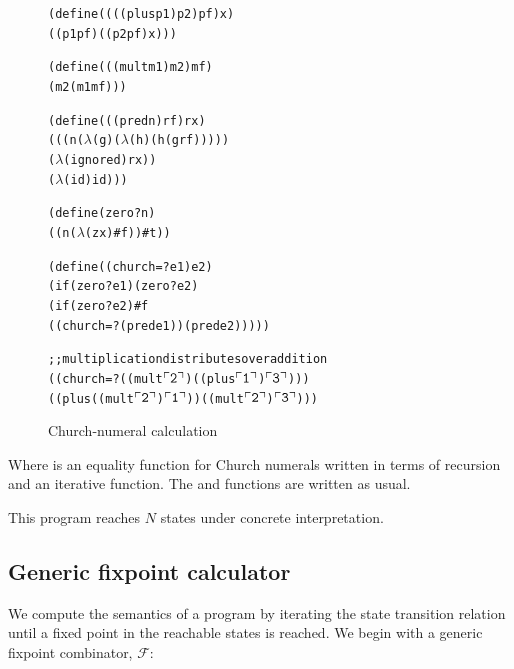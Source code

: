 \documentclass[preprint,onecolumn,9pt]{sigplanconf} %
\begin{document}
\newcommand{\church}[1]{\(\ulcorner{\tt #1}\urcorner\)}





\begin{figure}
\begin{alltt}
(define ((((plus p1) p2) pf) x)
  ((p1 pf) ((p2 pf) x)))

(define (((mult m1) m2) mf)
  (m2 (m1 mf)))

(define (((pred n) rf) rx)
  (((n (\(\lambda\) (g) (\(\lambda\) (h) (h (g rf)))))
    (\(\lambda\) (ignored) rx))
   (\(\lambda\) (id) id)))

(define (zero? n)
  ((n (\(\lambda\) (zx) #f)) #t))

(define ((church=? e1) e2)
  (if (zero? e1) (zero? e2)
      (if (zero? e2) #f
          ((church=? (pred e1)) (pred e2)))))

;; multiplication distributes over addition
((church=? ((mult \church2) ((plus \church1) \church3)))
 ((plus ((mult \church2) \church1)) ((mult \church2) \church3)))
\end{alltt}
\caption{Church-numeral calculation}
\end{figure}

Where  is an equality function for Church numerals
written in terms of recursion and an iterative  function.
The  and  functions are written as usual.

This program reaches $N$ states under concrete interpretation.

\newpage
\subsection{Generic fixpoint calculator}

We compute the semantics of a program by iterating the state
transition relation until a fixed point in the reachable states is
reached. We begin with a generic fixpoint combinator, ${\mathcal F}$:
\end{document}
